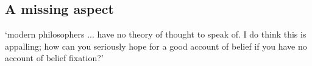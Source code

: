 \documentclass[11pt]{extarticle}
\begin{document}
\begin{multicols}{3}
\section{A missing aspect}
`modern philosophers ... have no theory of thought to speak of. I do think this is appalling; how can you seriously hope for a good account of belief if you have no account of belief fixation?'%
\citep%
{Fodor:1987rt}




\footnotesize 


\end{multicols}
\end{document}
